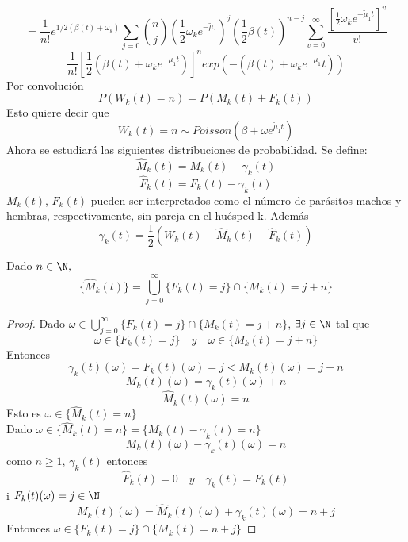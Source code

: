 $$=\frac{1}{n!}e^{1/2(\beta(t)+\omega_k)} \sum_{j=0}{n\choose j}(\frac{1}{2}\omega_k e^{-\tilde{\mu}_1})^j(\frac{1}{2}\beta(t))^{n-j}\sum_{v=0}^\infty\frac{[\frac{1}{2}\omega_k e^{-\tilde{\mu}_1t}]^v}{v!}  $$
$$\frac{1}{n!}[\frac{1}{2}(\beta(t)+\omega_k e^{-\tilde{\mu}_1t})]^n exp(-(\beta(t)+\omega_k e^{-\tilde{\mu}_1}t) ) $$
Por convolución $$P(W_k(t)=n)=P(M_k(t)+F_k(t))$$
Esto quiere decir que $$W_k(t)=n\sim Poisson(\beta+\omega e^{\tilde{\mu}_1 t})$$
Ahora se estudiará las siguientes distribuciones de probabilidad.
Se define: $$\hat{M}_k(t)=M_k(t)-\gamma_k(t)$$
$$\hat{F}_k(t)=F_k(t)-\gamma_k(t)$$
$M_k(t)$, $F_k(t)$ pueden ser interpretados como el número de parásitos machos y hembras, respectivamente, sin pareja en el huésped k.
Además $$\gamma_k(t)=\frac{1}{2}(W_k(t)-\hat{M}_k(t)-\hat{F}_k(t) )$$
\begin{Lem}
    Dado $n\in\N,$
    $$\{\hat{M}_k(t)\}=\bigcup_{j=0}^\infty \{F_k(t)=j\}\cap\{M_k(t)=j+n\}$$
    \begin{proof}
        Dado $\omega\in\bigcup_{j=0}^\infty \{F_k(t)=j\}\cap\{M_k(t)=j+n\}$, $\exists j\in\N$ tal que $$\omega\in\{F_k(t)=j\}\quad y \quad\omega\in\{M_k(t)=j+n\}$$
        Entonces $$\gamma_k(t)(\omega)=F_k(t)(\omega)=j<M_k(t)(\omega)=j+n$$
        $$M_k(t)(\omega)=\gamma_k(t)(\omega)+n$$
        $$\hat{M}_k(t)(\omega)=n$$
        Esto es $\omega\in\{\hat{M}_k(t)=n\}$\\
        Dado $\omega\in\{\hat{M}_k(t)=n\}=\{M_k(t)-\gamma_k(t)=n\}$\\$$M_k(t)(\omega)-\gamma_k(t)(\omega)=n$$
        como $n\geq 1$, $\gamma_k(t)$ entonces $$\hat{F}_k(t)=0\quad y \quad \gamma_k(t)=F_k(t)$$
        i $F_k(t)(\omega)=j\in\N$
        $$M_k(t)(\omega)=\hat{M}_k(t)(\omega)+\gamma_k(t)(\omega)=n+j$$
        Entonces $\omega\in\{F_k(t)=j\}\cap\{M_k(t)=n+j\}$
    \end{proof}
\end{Lem}
\label{LEMAIMPORTANTE}
